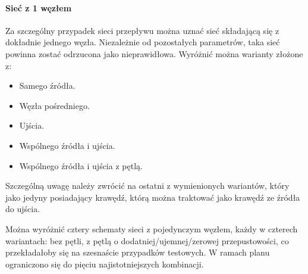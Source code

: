 \begin{itemize}[nosep]
\begin{itemize}[nosep]
\begin{itemize}[nosep]
\paragraph{Sieć z 1 węzłem}
Za szczególny przypadek sieci przepływu można uznać sieć składającą się z
dokładnie jednego węzła. Niezależnie od pozostałych parametrów, taka sieć
powinna zostać odrzucona jako nieprawidłowa. Wyróżnić można warianty złożone z:
\begin{itemize}[nosep]
    \item Samego źródła.
    \item Węzła pośredniego.
    \item Ujścia.
    \item Wspólnego źródła i ujścia.
    \item Wspólnego źródła i ujścia z pętlą.
\end{itemize}
Szczególną uwagę należy zwrócić na ostatni z wymienionych wariantów, który jako
jedyny posiadający krawędź, którą można traktować jako krawędź ze źródła do
ujścia.

Można wyróżnić cztery schematy sieci z pojedynczym węzłem, każdy w czterech
wariantach: bez pętli, z pętlą o dodatniej/ujemnej/zerowej przepustowości, co
przekładałoby się na szesnaście przypadków testowych. W ramach planu ograniczono
się do pięciu najistotniejszych kombinacji.


\end{itemize}
\end{itemize}
\end{itemize}
